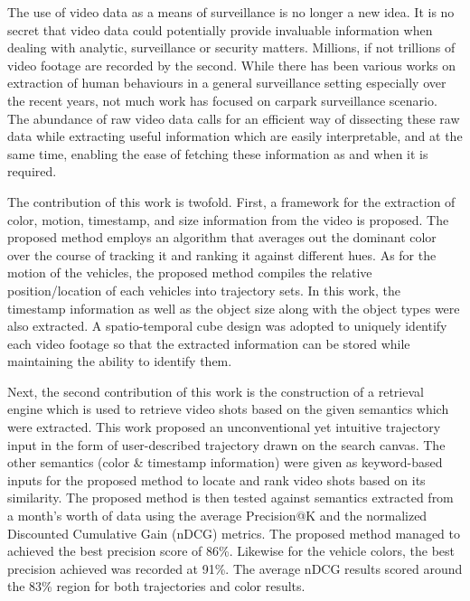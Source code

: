 
The use of video data as a means of surveillance is no longer a new idea. It is no secret that video data could potentially provide invaluable information when dealing with analytic, surveillance or security matters. Millions, if not trillions of video footage are recorded by the second. While there has been various works on extraction of human behaviours in a general surveillance setting especially over the recent years, not much work has focused on carpark surveillance scenario. The abundance of raw video data calls for an efficient way of dissecting these raw data while extracting useful information which are easily interpretable, and at the same time, enabling the ease of fetching these information as and when it is required. 

The contribution of this work is twofold. First, a framework for the extraction of color, motion, timestamp, and size information from the video is proposed. 
The proposed method employs an algorithm that averages out the dominant color over the course of tracking it and ranking it against different hues. 
As for the motion of the vehicles, the proposed method compiles the relative position/location of each vehicles into trajectory sets. In this work, the timestamp information as well as the object size along with the object types were also extracted. A spatio-temporal cube design was adopted to uniquely identify each video footage so that the extracted information can be stored while maintaining the ability to identify them.  

Next, the second contribution of this work is the construction of a retrieval engine which is used to retrieve video shots based on the given semantics which were extracted. This work proposed an unconventional yet intuitive trajectory input in the form of user-described trajectory drawn on the search canvas. 
The other semantics (color \& timestamp information) were given as keyword-based inputs for the proposed method to locate and rank video shots based on its similarity. 
The proposed method is then tested against semantics extracted from a month's worth of data 
using the average Precision@K and the normalized Discounted Cumulative Gain (nDCG) metrics. The proposed method managed to achieved the best precision score of 86\%. Likewise for the vehicle colors, the best precision achieved was recorded at 91\%. The average nDCG results scored around the 83\% region for both trajectories and color results. 

